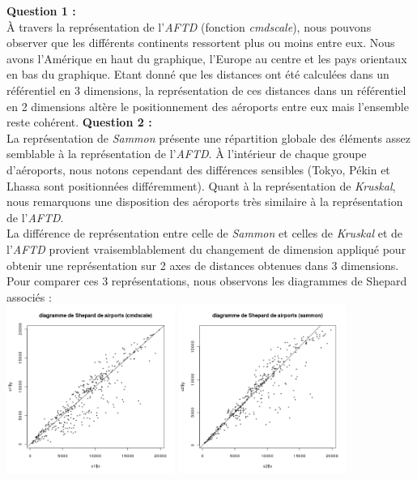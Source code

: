 \documentclass[a4paper, 10pt]{article}
\begin{document}
\textbf{Question 1 :}\\
À travers la représentation de l'\textit{AFTD} (fonction \textit{cmdscale}), nous pouvons observer que les différents continents ressortent plus ou moins
entre eux.
Nous avons l'Amérique en haut du graphique, l'Europe au centre et les pays orientaux en bas du graphique.
Etant donné que les distances ont été calculées dans un référentiel en 3 dimensions, la représentation de ces distances dans un référentiel en 2 dimensions
altère le positionnement des aéroports entre eux mais l'ensemble reste cohérent.
\newpage
\noindent
\textbf{Question 2 :}\\
La représentation de \textit{Sammon} présente une répartition globale des éléments assez semblable à la représentation de l'\textit{AFTD}.
À l'intérieur de chaque groupe d'aéroports, nous notons cependant des différences sensibles (Tokyo, Pékin et Lhassa sont positionnées
différemment).
Quant à la représentation de \textit{Kruskal}, nous remarquons une disposition des aéroports très similaire à la représentation de l'\textit{AFTD}.
\\La différence de représentation entre celle de \textit{Sammon} et celles de \textit{Kruskal} et de l'\textit{AFTD} provient vraisemblablement
du changement de dimension appliqué pour obtenir une représentation sur 2 axes de distances obtenues dans 3 dimensions.\\
Pour comparer ces 3 représentations, nous observons les diagrammes de Shepard associés :\\
\includegraphics[height = 5.5cm, width = 5.5cm]{plots/plot_airports_shepard_cmdscale.png}
\includegraphics[height = 5.5cm, width = 5.5cm]{plots/plot_airports_shepard_sammon.png}
\end{document}
